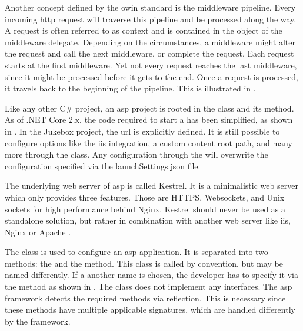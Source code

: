 Another concept defined by the \gls{owin} standard is the middleware pipeline. Every incoming \gls{http} request will traverse this pipeline and be processed along the way. A request is often referred to as context and is contained in the  object of the middleware delegate. Depending on the circumstances, a middleware might alter the request and call the next middleware, or complete the request. Each request starts at the first middleware. Yet not every request reaches the last middleware, since it might be processed before it gets to the end. Once a request is processed, it travels back to the beginning of the pipeline. This is illustrated in .



Like any other C\# project, an \gls{asp} project is rooted in the  class and its  method. As of .NET Core 2.x, the code required to start a  has been simplified, as shown in  \cite{aspFundamentals}. In the Jukebox project, the \gls{url} is explicitly defined. It is still possible to configure options like the \gls{iis} integration, a custom content root path, and many more through the  class. Any configuration through the  will overwrite the configuration specified via the launchSettings.json file.

The underlying web server of \gls{asp} is called Kestrel. It is a minimalistic web server which only provides three features. Those are HTTPS, Websockets, and Unix sockets for high performance behind Nginx. Kestrel should never be used as a standalone solution, but rather in combination with another web server like \gls{iis}, Nginx or Apache \cite{kestrel}.




The  class is used to configure an \gls{asp} application. It is separated into two methods: the  and the  method. This class is called  by convention, but may be named differently. If a another name is chosen, the developer has to specify it via the  method as shown in . The  class does not implement any interfaces. The \gls{asp} framework detects the required methods via reflection. This is necessary since these methods have multiple applicable signatures, which are handled differently by the framework.

